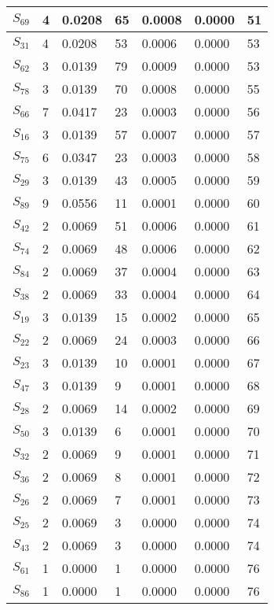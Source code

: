 \begin{xltabular}{\textwidth}{|X|X|X|X|X|X|X|}
 $S_{69}$ & 4 & 0.0208 & 65 & 0.0008 & 0.0000 & 51 \\ \hline
 $S_{31}$ & 4 & 0.0208 & 53 & 0.0006 & 0.0000 & 53 \\ \hline
 $S_{62}$ & 3 & 0.0139 & 79 & 0.0009 & 0.0000 & 53 \\ \hline
 $S_{78}$ & 3 & 0.0139 & 70 & 0.0008 & 0.0000 & 55 \\ \hline
 $S_{66}$ & 7 & 0.0417 & 23 & 0.0003 & 0.0000 & 56 \\ \hline
 $S_{16}$ & 3 & 0.0139 & 57 & 0.0007 & 0.0000 & 57 \\ \hline
 $S_{75}$ & 6 & 0.0347 & 23 & 0.0003 & 0.0000 & 58 \\ \hline
 $S_{29}$ & 3 & 0.0139 & 43 & 0.0005 & 0.0000 & 59 \\ \hline
 $S_{89}$ & 9 & 0.0556 & 11 & 0.0001 & 0.0000 & 60 \\ \hline
 $S_{42}$ & 2 & 0.0069 & 51 & 0.0006 & 0.0000 & 61 \\ \hline
 $S_{74}$ & 2 & 0.0069 & 48 & 0.0006 & 0.0000 & 62 \\ \hline
 $S_{84}$ & 2 & 0.0069 & 37 & 0.0004 & 0.0000 & 63 \\ \hline
 $S_{38}$ & 2 & 0.0069 & 33 & 0.0004 & 0.0000 & 64 \\ \hline
 $S_{19}$ & 3 & 0.0139 & 15 & 0.0002 & 0.0000 & 65 \\ \hline
 $S_{22}$ & 2 & 0.0069 & 24 & 0.0003 & 0.0000 & 66 \\ \hline
 $S_{23}$ & 3 & 0.0139 & 10 & 0.0001 & 0.0000 & 67 \\ \hline
 $S_{47}$ & 3 & 0.0139 & 9 & 0.0001 & 0.0000 & 68 \\ \hline
 $S_{28}$ & 2 & 0.0069 & 14 & 0.0002 & 0.0000 & 69 \\ \hline
 $S_{50}$ & 3 & 0.0139 & 6 & 0.0001 & 0.0000 & 70 \\ \hline
 $S_{32}$ & 2 & 0.0069 & 9 & 0.0001 & 0.0000 & 71 \\ \hline
 $S_{36}$ & 2 & 0.0069 & 8 & 0.0001 & 0.0000 & 72 \\ \hline
 $S_{26}$ & 2 & 0.0069 & 7 & 0.0001 & 0.0000 & 73 \\ \hline
 $S_{25}$ & 2 & 0.0069 & 3 & 0.0000 & 0.0000 & 74 \\ \hline
 $S_{43}$ & 2 & 0.0069 & 3 & 0.0000 & 0.0000 & 74 \\ \hline
 $S_{61}$ & 1 & 0.0000 & 1 & 0.0000 & 0.0000 & 76 \\ \hline
 $S_{86}$ & 1 & 0.0000 & 1 & 0.0000 & 0.0000 & 76 \\ \hline

\end{xltabular}
